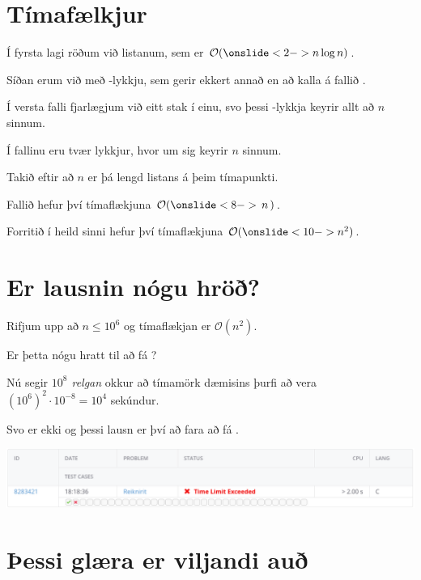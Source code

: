 \section{Tímafælkjur}
{
    {
        \item<1-> Í fyrsta lagi röðum við listanum, sem er $\mathcal{O}(\onslide<2->{n \log n})$.
        \item<3-> Síðan erum við með -lykkju, sem gerir ekkert annað en að kalla á fallið .
        \item<4-> Í versta falli fjarlægjum við eitt stak í einu, svo þessi -lykkja keyrir allt að $n$ sinnum.
        \item<5-> Í fallinu  eru tvær lykkjur, hvor um sig keyrir $n$ sinnum.
        \item<6-> Takið eftir að $n$ er þá lengd listans á þeim tímapunkti.
        \item<7-> Fallið  hefur því tímaflækjuna $\mathcal{O}(\onslide<8->{\,n\,})$.
        \item<9-> Forritið í heild sinni hefur því tímaflækjuna $\mathcal{O}(\onslide<10->{n^2})$.
    }
}

\section{Er lausnin nógu hröð?}
{
    {
        \item<1-> Rifjum upp að $n \leq 10^6$ og tímaflækjan er $\mathcal{O}(n^2)$.
        \item<2-> Er þetta nógu hratt til að fá ?
        \item<3-> Nú segir \emph{$10^8$ relgan} okkur að tímamörk dæmisins þurfi að vera $(10^6)^2 \cdot 10^{-8} = 10^4$ sekúndur.
        \item<4-> Svo er ekki og þessi lausn er því að fara að fá .
        \item<5->[] \includegraphics[scale = 0.25]{fig/tle}
    }
}

\section{Þessi glæra er viljandi auð}
{
}


